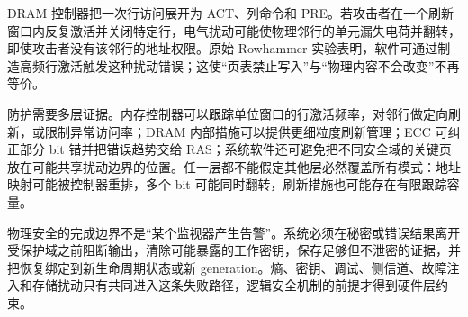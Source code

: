 
DRAM 控制器把一次行访问展开为 ACT、列命令和 PRE。若攻击者在一个刷新窗口内反复激活并关闭特定行，电气扰动可能使物理邻行的单元漏失电荷并翻转，即使攻击者没有该邻行的地址权限。原始 Rowhammer 实验表明，软件可通过制造高频行激活触发这种扰动错误；这使“页表禁止写入”与“物理内容不会改变”不再等价。\cite{rowhammer-isca}

防护需要多层证据。内存控制器可以跟踪单位窗口的行激活频率，对邻行做定向刷新，或限制异常访问率；DRAM 内部措施可以提供更细粒度刷新管理；ECC 可纠正部分 bit 错并把错误趋势交给 RAS；系统软件还可避免把不同安全域的关键页放在可能共享扰动边界的位置。任一层都不能假定其他层必然覆盖所有模式：地址映射可能被控制器重排，多个 bit 可能同时翻转，刷新措施也可能存在有限跟踪容量。

物理安全的完成边界不是“某个监视器产生告警”。系统必须在秘密或错误结果离开受保护域之前阻断输出，清除可能暴露的工作密钥，保存足够但不泄密的证据，并把恢复绑定到新生命周期状态或新 generation。熵、密钥、调试、侧信道、故障注入和存储扰动只有共同进入这条失败路径，逻辑安全机制的前提才得到硬件层约束。
